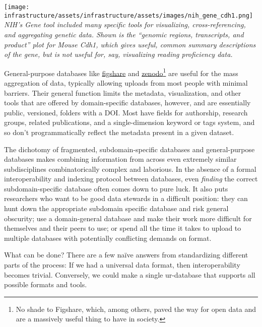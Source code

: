 \texttt{[image: infrastructure/assets/infrastructure/assets/images/nih\_gene\_cdh1.png]}
\emph{NIH's Gene tool included many specific tools for visualizing,
cross-referencing, and aggregating genetic data. Shown is the ``genomic
regions, transcripts, and product'' plot for Mouse Cdh1, which gives
useful, common summary descriptions of the gene, but is not useful for,
say, visualizing reading proficiency data.}

General-purpose databases like \href{https://figshare.com/}{figshare}
and \href{https://zenodo.org/}{zenodo}\footnote{No shade to Figshare,
  which, among others, paved the way for open data and are a massively
  useful thing to have in society.} are useful for the mass aggregation
of data, typically allowing uploads from most people with minimal
barriers. Their general function limits the metadata, visualization, and
other tools that are offered by domain-specific databases, however, and
are essentially public, versioned, folders with a DOI. Most have fields
for authorship, research groups, related publications, and a
single-dimension keyword or tags system, and so don't programmatically
reflect the metadata present in a given dataset.

The dichotomy of fragmented, subdomain-specific databases and
general-purpose databases makes combining information from across even
extremely similar subdisciplines combinatorically complex and laborious.
In the absence of a formal interoperability and indexing protocol
between databases, even \emph{finding} the correct subdomain-specific
database often comes down to pure luck. It also puts researchers who
want to be good data stewards in a difficult position: they can hunt
down the appropriate subdomain specific database and risk general
obscurity; use a domain-general database and make their work more
difficult for themselves and their peers to use; or spend all the time
it takes to upload to multiple databases with potentially conflicting
demands on format.

What can be done? There are a few naïve answers from standardizing
different parts of the process: If we had a universal data format, then
interoperability becomes trivial. Conversely, we could make a single
ur-database that supports all possible formats and tools.

